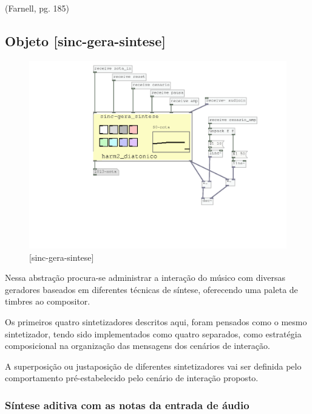 \documentclass{ppgmus}
\begin{document}
(Farnell, pg. 185)


\subsection{ Objeto [sinc-gera-sintese]}


\begin{figure}[!ht]
\includegraphics[scale=.6]{sinc-gera-sintese}
\caption{[sinc-gera-sintese]}
\label{sincgerasintese}
\end{figure}



Nessa abstração procura-se administrar a interação do músico
com diversas geradores baseados em diferentes técnicas de síntese,
oferecendo uma paleta de timbres ao compositor.

Os primeiros quatro sintetizadores descritos aqui, foram pensados como o mesmo
sintetizador, tendo sido implementados como quatro separados, como estratégia
composicional na organização das mensagens dos cenários de interação.




A superposição ou justaposição de diferentes sintetizadores vai
ser definida pelo comportamento pré-estabelecido pelo cenário de interação
proposto.





\subsubsection{Síntese aditiva com as notas da entrada de áudio}
\end{document}
